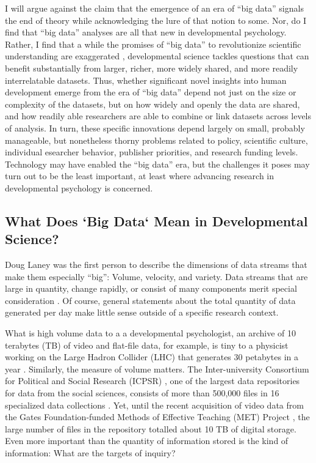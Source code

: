 \documentclass[letterpaper,man,apacite]{apa6}
\begin{document}
I will argue against the claim that the emergence of an era of ``big data'' signals the end of theory \cite{anderson_end_2008} while acknowledging the lure of that notion to some.
Nor, do I find that ``big data'' analyses are all that new in developmental psychology.
Rather, I find that a while the promises of ``big data'' to revolutionize scientific understanding are exaggerated \cite{boyd_critical_2012}, developmental science tackles questions that can benefit substantially from larger, richer, more widely shared, and more readily interrelatable datasets.
Thus, whether significant novel insights into human development emerge from the era of ``big data'' depend not just on the size or complexity of the datasets, but on how widely and openly the data are shared, and how readily able researchers are able to combine or link datasets across levels of analysis.
In turn, these specific innovations depend largely on small, probably manageable, but nonetheless thorny problems related to policy, scientific culture, individual esearcher behavior, publisher priorities, and research funding levels.
Technology may have enabled the ``big data'' era, but the challenges it poses may turn out to be the least important, at least where advancing research in developmental psychology is concerned.

 \subsection{What Does `Big Data` Mean in Developmental Science?}

Doug Laney \cite{laney01controlling3v} was the first person to describe the dimensions of data streams that make them especially ``big'': Volume, velocity, and variety.
Data streams that are large in quantity, change rapidly, or consist of many components merit special consideration \cite{ibm_2015}.
Of course, general statements about the total quantity of data generated per day \cite{ibm_2015} make little sense outside of a specific research context.

What is high volume data to a a developmental psychologist, an archive of 10 terabytes (TB) of video and flat-file data, for example, is tiny to a physicist working on the Large Hadron Collider (LHC) that generates 30 petabytes in a year \cite{CERN_LHC}.
Similarly, the measure of volume matters.
The Inter-university Consortium for Political and Social Research (ICPSR) \cite{ICSPR}, one of the largest data repositories for data from the social sciences, consists of more than 500,000 files in 16 specialized data collections \cite{ICPSR}.
Yet, until the recent acquisition of video data from the Gates Foundation-funded Methods of Effective Teaching (MET) Project \cite{METProject}, the large number of files in the repository totalled about 10 TB of digital storage.
Even more important than the quantity of information stored is the kind of information: What are the targets of inquiry?
\end{document}
